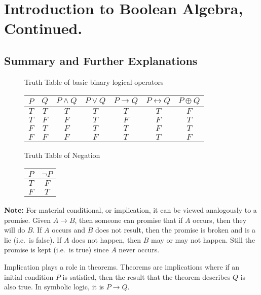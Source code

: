 
\section{Introduction to Boolean Algebra, Continued.}

\subsection{Summary and Further Explanations}

\begin{figure}[H]
    \centering
    Truth Table of basic binary logical operators
    \begin{tabular}{ccccccc}
        \(P\) & \(Q\) & \(P\land Q\) & \(P\lor Q\) & \(P\rightarrow Q\) & \(P\leftrightarrow Q\) & \(P\oplus Q\) \\
        \hline
        \(T\) & \(T\) & \(T\) & \(T\) & \(T\) & \(T\) & \(F\) \\
        \(T\) & \(F\) & \(F\) & \(T\) & \(F\) & \(F\) & \(T\) \\
        \(F\) & \(T\) & \(F\) & \(T\) & \(T\) & \(F\) & \(T\) \\
        \(F\) & \(F\) & \(F\) & \(F\) & \(T\) & \(T\) & \(F\)
    \end{tabular}
\end{figure} 
\begin{figure}[H]
    \centering
    Truth Table of Negation

    \begin{tabular}{cc}
        \(P\) & \(\lnot P\) \\
        \hline
        \(T\) & \(F\) \\
        \(F\) & \(T\)
    \end{tabular}
\end{figure}

\textbf{Note:} For material conditional, or implication, it can be viewed analogously to a promise. Given \(A\rightarrow B\),
then someone can promise that if \(A\) occurs, then they will do \(B\). If \(A\) occurs and \(B\) does not result, then the 
promise is broken and is a lie (i.e.\ is false). If \(A\) does not happen, then \(B\) may or may not happen. Still the promise
is kept (i.e.\ is true) since \(A\) never occurs.

Implication plays a role in theorems. Theorems are implications where if an initial condition \(P\) is satisfied, then the result
that the theorem describes \(Q\) is also true. In symbolic logic, it is \(P\rightarrow Q\). 

